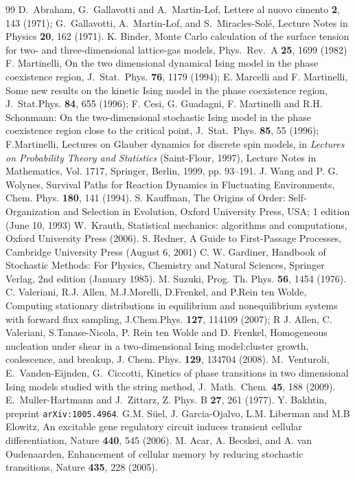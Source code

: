 \documentclass[aps,twocolumn,floats,pre,amsmath,superscriptaddress]{revtex4}
\newcommand{\<}{\langle}
\renewcommand{\>}{\rangle}
\begin{document}
\begin{thebibliography}{99}
  D.~Abraham, G.~Gallavotti and A.~Martin-Lof, Lettere al nuovo cimento {\bf 2}, 143 (1971); 
  G.~Gallavotti, A.~Martin-Lof, and S.~Miracles-Sol\'e, Lecture Notes in Physics {\bf 20}, 162 (1971).
   K. Binder, Monte Carlo calculation of the surface tension for two- and three-dimensional lattice-gas models, Phys.~Rev.~A {\bf 25}, 1699 (1982)
 F. Martinelli, On the two dimensional dynamical Ising model in the phase coexistence region, J.~Stat.~Phys. {\bf 76}, 1179 (1994);
 E. Marcelli and F. Martinelli, Some new results on the kinetic Ising model in the phase coexistence region, J.~Stat.Phys. {\bf 84}, 655 (1996);
F. Cesi, G. Guadagni, F. Martinelli and R.H. Schonmann: On the two-dimensional stochastic Ising model in the phase coexistence region close to the critical point, J.~Stat.~Phys. {\bf 85}, 55 (1996); F.Martinelli, Lectures on Glauber dynamics for discrete spin models, in {\it Lectures on
Probability Theory and Statistics} (Saint-Flour, 1997), Lecture Notes in Mathematics,
Vol. 1717, Springer, Berlin, 1999, pp. 93–191.
%
 J. Wang and P. G. Wolynes, Survival Paths for Reaction Dynamics in Fluctuating Environments, Chem. Phys. {\bf 180}, 141 (1994).
S. Kauffman, The Origins of Order: Self-Organization and Selection in Evolution,  Oxford University Press, USA; 1 edition (June 10, 1993)
 W.~Krauth, Statistical mechanics: algorithms and computations, Oxford University Press (2006).
S. Redner, A Guide to First-Passage Processes, Cambridge University Press (August 6, 2001)
C. W. Gardiner, Handbook of Stochastic Methods: For Physics, Chemistry and Natural Sciences, Springer Verlag, 2nd edition (January 1985).
 M. Suzuki, Prog. Th. Phys. {\bf 56}, 1454 (1976).
 C. Valeriani, R.J. Allen, M.J.Morelli, D.Frenkel, and P.Rein ten Wolde, Computing stationary distributions in equilibrium and nonequilibrium systems with forward flux sampling,
 J.Chem.Phys. {\bf 127}, 114109 (2007);
 R J. Allen, C. Valeriani, S.Tanase-Nicola, P. Rein ten Wolde and D.  Frenkel, Homogeneous nucleation under shear in a two-dimensional Ising model:cluster growth, coalescence, and breakup,
 J. Chem. Phys. {\bf 129}, 134704 (2008).
%
M.~Venturoli, E.~Vanden-Eijnden, G.~Ciccotti, Kinetics of phase transitions in two dimensional Ising models studied with the string method,
J.~Math.~Chem. {\bf 45}, 188 (2009).
%
E.~Muller-Hartmann and J.~Zittarz, Z. Phys. B {\bf 27}, 261 (1977).
Y. Bakhtin, preprint {\tt arXiv:1005.4964}.
G.M. S\"uel, J. Garcia-Ojalvo, L.M. Liberman and  M.B Elowitz, An excitable gene regulatory circuit induces transient cellular differentiation, Nature {\bf 440}, 545 (2006). 
M. Acar, A. Becskei, and A. van Oudenaarden, Enhancement of cellular memory by reducing stochastic transitions, Nature {\bf 435}, 228 (2005).

 \end{thebibliography}
\end{document}
